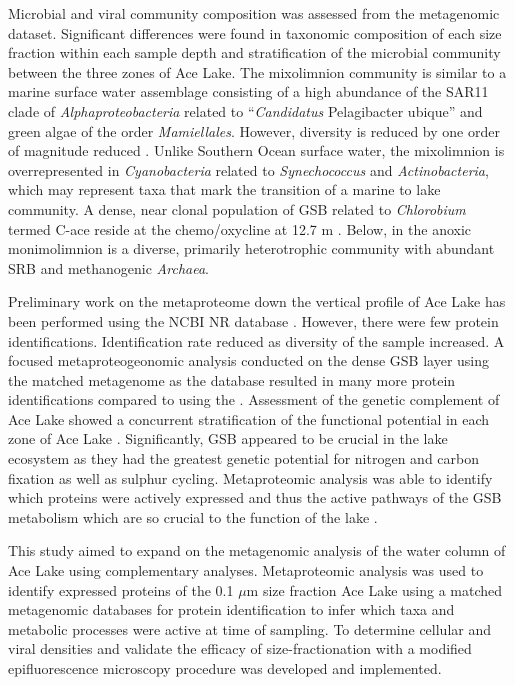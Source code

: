 Microbial and viral community composition was assessed from the metagenomic dataset.
Significant differences were found in taxonomic composition of each size fraction within each sample depth and stratification of the microbial community between the three zones of Ace Lake.
The mixolimnion community is similar to a marine surface water assemblage consisting of a high abundance of the SAR11 clade of \emph{Alphaproteobacteria} related to ``\emph{Candidatus} Pelagibacter ubique'' and green algae of the order \emph{Mamiellales}.
However, diversity is reduced by one order of magnitude reduced \cite{Lauro2011}.
Unlike Southern Ocean surface water, the mixolimnion is overrepresented in \emph{Cyanobacteria} related to \emph{Synechococcus} and \emph{Actinobacteria}, which may represent taxa that mark the transition of a marine to lake community.
A dense, near clonal population of \acl{GSB} related to \emph{Chlorobium} termed C-ace reside at the chemo/oxycline at 12.7 m \cite{Ng2010a, Lauro2011}.
Below, in the anoxic monimolimnion is a diverse, primarily heterotrophic community with abundant \ac{SRB} and methanogenic \emph{Archaea}.

Preliminary work on the metaproteome down the vertical profile of Ace Lake has been performed using the \ac{NCBI} \ac{NR} database \cite{2010b}.
However, there were few protein identifications.
Identification rate reduced as diversity of the sample increased.
A focused metaproteogeonomic analysis conducted on the dense \ac{GSB} layer using the matched metagenome as the database resulted in many more protein identifications compared to using the \cite{Ng2010b}.
Assessment of the genetic complement of Ace Lake showed a concurrent stratification of the functional potential in each zone of Ace Lake \cite{Lauro2011}.
Significantly, \ac{GSB} appeared to be crucial in the lake ecosystem as they had the greatest genetic potential for nitrogen and carbon fixation as well as sulphur cycling\cite{Ng2010, Lauro2011}.
Metaproteomic analysis was able to identify which proteins were actively expressed and thus the active pathways of the \ac{GSB} metabolism which are so crucial to the function of the lake \cite{Ng2010a}.

This study aimed to expand on the metagenomic analysis of the water column of Ace Lake using complementary analyses.
Metaproteomic analysis was used to identify expressed proteins of the 0.1 $\mu$m size fraction Ace Lake using a matched metagenomic databases for protein identification to infer which taxa and metabolic processes were active at time of sampling.
To determine cellular and viral densities and validate the efficacy of size-fractionation with a modified epifluorescence microscopy procedure was developed and implemented.

